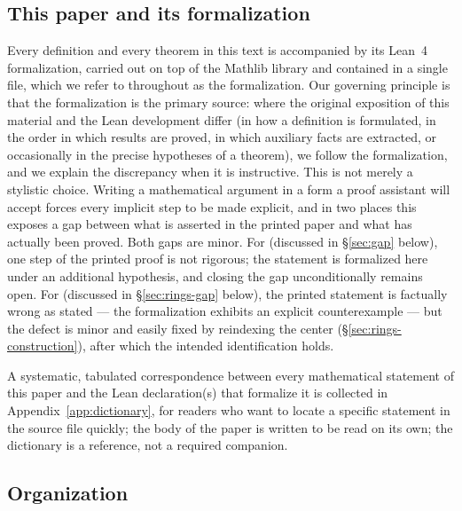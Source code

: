 \documentclass[11pt]{amsart}
\theoremstyle{plain}
\theoremstyle{definition}
\theoremstyle{remark}
\begin{document}
\subsection{This paper and its formalization}

Every definition and every theorem in this text is accompanied by its Lean~4
\citep{Lean4} formalization,
carried out on top of the Mathlib library \citep{mathlib} and contained in a single file, which we refer to
throughout as the formalization. Our governing principle is that the
formalization is the primary source: where the original exposition of this material and
the Lean development differ (in how a definition is formulated, in the order in which
results are proved, in which auxiliary facts are extracted, or occasionally in the precise
hypotheses of a theorem), we follow the formalization, and we explain the discrepancy when
it is instructive. This is not merely a stylistic choice. Writing a mathematical argument in
a form a proof assistant will accept forces every implicit step to be made explicit, and in
two places this exposes a gap between what is asserted in the printed paper and what has
actually been proved. Both gaps are minor. For \citep[Proposition~3.15]{Mayeux} (discussed
in \S\ref{sec:gap} below), one step of the printed proof is not rigorous; the statement is
formalized here under an additional hypothesis, and closing the gap unconditionally remains
open. For \citep[Proposition~5.1]{Mayeux} (discussed in \S\ref{sec:rings-gap} below), the
printed statement is factually wrong as stated --- the formalization exhibits an explicit
counterexample --- but the defect is minor and easily fixed by reindexing the center
(\S\ref{sec:rings-construction}), after which the intended identification holds.

A systematic, tabulated correspondence between every mathematical statement of this paper and
the Lean declaration(s) that formalize it is collected in Appendix~\ref{app:dictionary}, for
readers who want to locate a specific statement in the source file quickly; the body of the
paper is written to be read on its own; the dictionary is a reference, not a required
companion.

\subsection{Organization}
\label{sec:organization}
\end{document}
